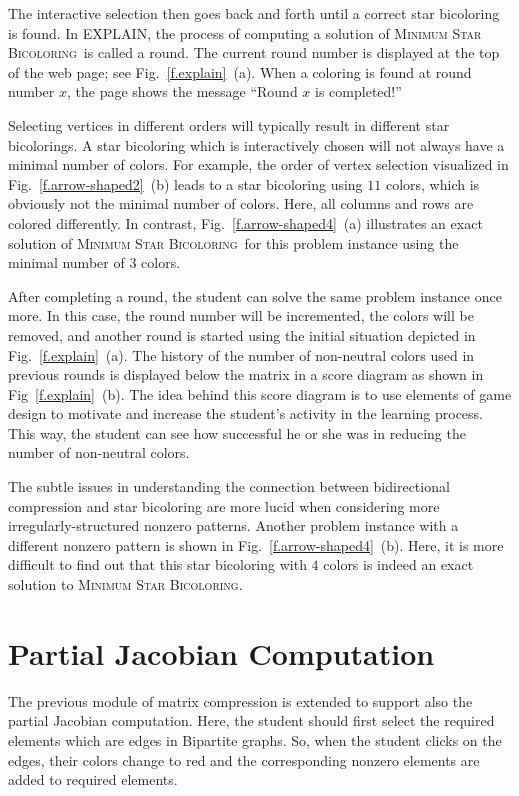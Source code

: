 \documentclass[12pt, oneside]{book}
\newcommand{\MinStaBic}{\textsc{Minimum Star Bicoloring}}
\begin{document}
The interactive selection then goes back and forth until a correct star bicoloring is
found. In EXPLAIN, the process of computing a solution of \MinStaBic\ is called a round.
The current round number is displayed at the top of the web page; see
Fig.~\ref{f.explain}~(a). When a coloring is found at round number $x$, the page shows
the message ``Round $x$ is completed!''

Selecting vertices in different orders will typically result in different star
bicolorings. A star bicoloring which is interactively chosen will not always have a
minimal number of colors. For example, the order of vertex selection visualized in
Fig.~\ref{f.arrow-shaped2}~(b) leads to a star bicoloring using $11$ colors, which is
obviously not the minimal number of colors. Here, all columns and rows are colored
differently. In contrast, Fig.~\ref{f.arrow-shaped4}~(a) illustrates an exact solution of
\MinStaBic\ for this problem instance using the minimal number of $3$ colors.

After completing a round, the student can solve the same problem instance once more. In
this case, the round number will be incremented, the colors will be removed, and another
round is started using the initial situation depicted in Fig.~\ref{f.explain}~(a). The
history of the number of non-neutral colors used in previous rounds is displayed below
the matrix in a score diagram as shown in Fig~\ref{f.explain}~(b). The idea behind this
score diagram is to use elements of game design to motivate and increase the student's
activity in the learning process. This way, the student can see how successful he or she
was in reducing the number of non-neutral colors.

The subtle issues in understanding the connection between bidirectional compression and
star bicoloring are more lucid when considering more irregularly-structured nonzero
patterns. Another problem instance with a different nonzero pattern is shown in
Fig.~\ref{f.arrow-shaped4}~(b). Here, it is more difficult to find out that this star
bicoloring with $4$ colors is indeed an exact solution to \MinStaBic.

\section{Partial Jacobian Computation}
The previous module of matrix compression is extended to support
also the partial Jacobian computation. Here, the student should 
first select the required elements which are edges in Bipartite graphs.
So, when the student clicks on the edges, their colors change to red
and the corresponding nonzero elements are added to required elements.
\end{document}
